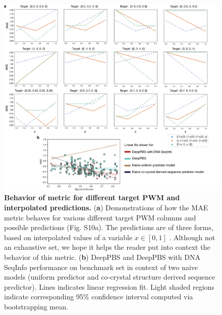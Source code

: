 \begin{center}
\begin{figure}[H]
  \includegraphics[width=\linewidth]{./pdnafigs/figS10.png}
    \caption[Behavior of metric for different target PWM and interpolated predictions.]{\textbf{Behavior of metric for different target PWM and interpolated predictions.} ({\bf a}) Demonstrations of how the MAE
metric behaves for various different target PWM columns and possible predictions (Fig. S10a). The predictions are of three forms, based on interpolated values of a variable $x \in [0,1]$ . Although not an exhaustive set, we hope it helps the reader put into context the behavior of this metric. ({\bf b}) DeepPBS
and DeepPBS with DNA SeqInfo performance on benchmark set in context of two naive models (uniform predictor
and co-crystal structure derived sequence predictor). Lines indicates linear regression fit. Light shaded regions
indicate corresponding 95$\%$ confidence interval computed via bootstrapping mean.}
  \label{fig:pdnaS10}
\end{figure}
\end{center}

